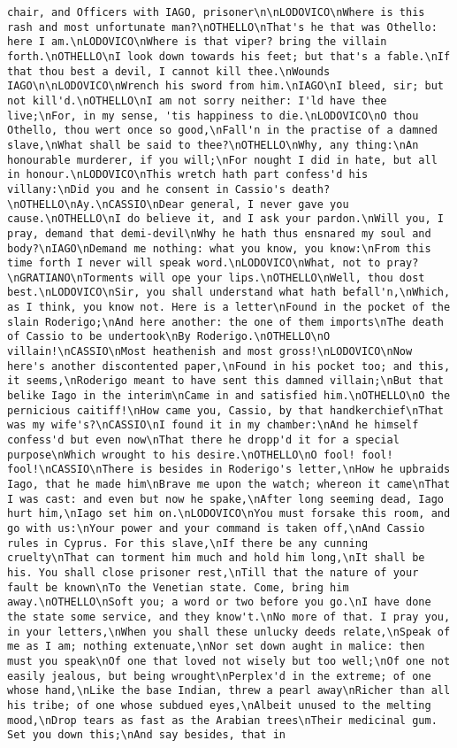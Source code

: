 \begin{verbatim}
chair, and Officers with IAGO, prisoner\n\nLODOVICO\nWhere is this rash and most unfortunate man?\nOTHELLO\nThat's he that was Othello: here I am.\nLODOVICO\nWhere is that viper? bring the villain forth.\nOTHELLO\nI look down towards his feet; but that's a fable.\nIf that thou best a devil, I cannot kill thee.\nWounds IAGO\n\nLODOVICO\nWrench his sword from him.\nIAGO\nI bleed, sir; but not kill'd.\nOTHELLO\nI am not sorry neither: I'ld have thee live;\nFor, in my sense, 'tis happiness to die.\nLODOVICO\nO thou Othello, thou wert once so good,\nFall'n in the practise of a damned slave,\nWhat shall be said to thee?\nOTHELLO\nWhy, any thing:\nAn honourable murderer, if you will;\nFor nought I did in hate, but all in honour.\nLODOVICO\nThis wretch hath part confess'd his villany:\nDid you and he consent in Cassio's death?\nOTHELLO\nAy.\nCASSIO\nDear general, I never gave you cause.\nOTHELLO\nI do believe it, and I ask your pardon.\nWill you, I pray, demand that demi-devil\nWhy he hath thus ensnared my soul and body?\nIAGO\nDemand me nothing: what you know, you know:\nFrom this time forth I never will speak word.\nLODOVICO\nWhat, not to pray?\nGRATIANO\nTorments will ope your lips.\nOTHELLO\nWell, thou dost best.\nLODOVICO\nSir, you shall understand what hath befall'n,\nWhich, as I think, you know not. Here is a letter\nFound in the pocket of the slain Roderigo;\nAnd here another: the one of them imports\nThe death of Cassio to be undertook\nBy Roderigo.\nOTHELLO\nO villain!\nCASSIO\nMost heathenish and most gross!\nLODOVICO\nNow here's another discontented paper,\nFound in his pocket too; and this, it seems,\nRoderigo meant to have sent this damned villain;\nBut that belike Iago in the interim\nCame in and satisfied him.\nOTHELLO\nO the pernicious caitiff!\nHow came you, Cassio, by that handkerchief\nThat was my wife's?\nCASSIO\nI found it in my chamber:\nAnd he himself confess'd but even now\nThat there he dropp'd it for a special purpose\nWhich wrought to his desire.\nOTHELLO\nO fool! fool! fool!\nCASSIO\nThere is besides in Roderigo's letter,\nHow he upbraids Iago, that he made him\nBrave me upon the watch; whereon it came\nThat I was cast: and even but now he spake,\nAfter long seeming dead, Iago hurt him,\nIago set him on.\nLODOVICO\nYou must forsake this room, and go with us:\nYour power and your command is taken off,\nAnd Cassio rules in Cyprus. For this slave,\nIf there be any cunning cruelty\nThat can torment him much and hold him long,\nIt shall be his. You shall close prisoner rest,\nTill that the nature of your fault be known\nTo the Venetian state. Come, bring him away.\nOTHELLO\nSoft you; a word or two before you go.\nI have done the state some service, and they know't.\nNo more of that. I pray you, in your letters,\nWhen you shall these unlucky deeds relate,\nSpeak of me as I am; nothing extenuate,\nNor set down aught in malice: then must you speak\nOf one that loved not wisely but too well;\nOf one not easily jealous, but being wrought\nPerplex'd in the extreme; of one whose hand,\nLike the base Indian, threw a pearl away\nRicher than all his tribe; of one whose subdued eyes,\nAlbeit unused to the melting mood,\nDrop tears as fast as the Arabian trees\nTheir medicinal gum. Set you down this;\nAnd say besides, that in 
\end{verbatim}
